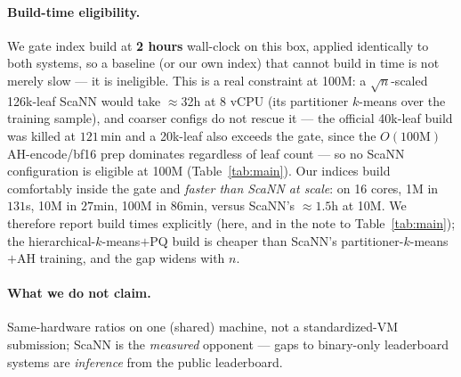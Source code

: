 \documentclass{article}
\begin{document}
\paragraph{Build-time eligibility.} We gate index build at \textbf{2 hours} wall-clock
on this box, applied identically to both systems, so a baseline (or our own index) that
cannot build in time is not merely slow --- it is ineligible. This is a real constraint
at 100M: a $\sqrt{n}$-scaled 126k-leaf ScaNN would take $\approx$32h at 8 vCPU (its
partitioner $k$-means over the training sample), and coarser configs do not rescue it
--- the official 40k-leaf build was killed at $121$\,min and a 20k-leaf also exceeds the
gate, since the $O(100\text{M})$ AH-encode/bf16 prep dominates regardless of leaf count
--- so no ScaNN configuration is eligible at 100M (Table~\ref{tab:main}). Our indices
build comfortably inside the gate and \emph{faster than ScaNN at scale}: on 16 cores,
1M in $131$s, 10M in $27$min, 100M in $86$min, versus ScaNN's $\approx\!1.5$h at 10M.
We therefore report build times explicitly (here, and in the note to
Table~\ref{tab:main}); the hierarchical-$k$-means$+$PQ build is cheaper than ScaNN's
partitioner-$k$-means$+$AH training, and the gap widens with $n$.

\paragraph{What we do not claim.} Same-hardware ratios on one (shared) machine, not a
standardized-VM submission; ScaNN is the \emph{measured} opponent --- gaps to
binary-only leaderboard systems are \emph{inference} from the public leaderboard.
\end{document}
